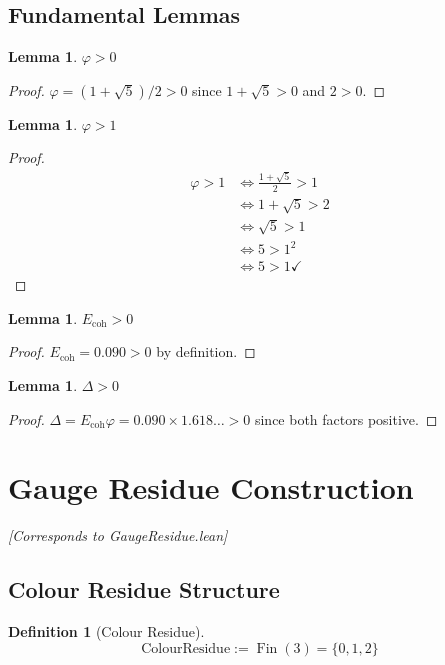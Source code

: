 \documentclass[11pt]{article}
\numberwithin{equation}{section}
\newtheorem{lemma}[theorem]{Lemma}
\newtheorem{definition}[theorem]{Definition}
\theoremstyle{remark}
\newcommand{\Ecoh}{E_{\text{coh}}}
\newcommand{\massGap}{\Delta}
\DeclareMathOperator{\Fin}{Fin}
\begin{document}
\subsection{Fundamental Lemmas}

\begin{lemma}
$\varphi > 0$
\end{lemma}
\begin{proof}
$\varphi = (1 + \sqrt{5})/2 > 0$ since $1 + \sqrt{5} > 0$ and $2 > 0$.
\end{proof}

\begin{lemma}
$\varphi > 1$
\end{lemma}
\begin{proof}
\begin{align}
\varphi > 1 &\iff \frac{1 + \sqrt{5}}{2} > 1\\
&\iff 1 + \sqrt{5} > 2\\
&\iff \sqrt{5} > 1\\
&\iff 5 > 1^2\\
&\iff 5 > 1 \checkmark
\end{align}
\end{proof}

\begin{lemma}
$\Ecoh > 0$
\end{lemma}
\begin{proof}
$\Ecoh = 0.090 > 0$ by definition.
\end{proof}

\begin{lemma}
$\massGap > 0$
\end{lemma}
\begin{proof}
$\massGap = \Ecoh \varphi = 0.090 \times 1.618\ldots > 0$ since both factors positive.
\end{proof}

\section{Gauge Residue Construction}
\textit{[Corresponds to GaugeResidue.lean]}

\subsection{Colour Residue Structure}

\begin{definition}[Colour Residue]
\[\text{ColourResidue} := \Fin(3) = \{0, 1, 2\}\]
\end{definition}
\end{document}
